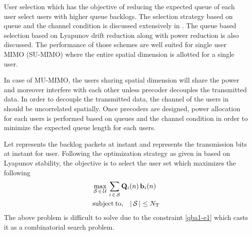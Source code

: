 
User selection which has the objective of reducing the expected queue of each user select users with higher queue backlogs. The selection strategy based on queue and the channel condition is discussed extensively in \cite{neely2012stability}. The queue based selection based on Lyapunov drift reduction along with power reduction is also discussed. The performance of those schemes are well suited for single user MIMO (SU-MIMO) where the entire spatial dimension is allotted for a single user. 

In case of MU-MIMO, the users sharing spatial dimension will share the power and moreover interfere with each other unless precoder decouples the transmitted data. In order to decouple the transmitted data, the channel of the users in  should be uncorrelated spatially. Once precoders are designed, power allocation for each users is performed based on queues and the channel condition in order to minimize the expected queue length for each users.

Let  represents the backlog packets at  instant and  represents the transmission bits at  instant for  user. Following the optimization strategy as given in \cite{neely2012stability} based on Lyapunov stability, the objective is to select the user set  which maximizes the following
\begin{eqnarray}
&\displaystyle \max_{\mathcal{S} \, \in \, \mathcal{U}} \, \sum_{i \, \in \, \mathcal{S}}\mathbf{Q}_i(n) \, \mathbf{b}_i(n) \\
&\displaystyle \mathrm{subject \: to,} \quad | \, \mathcal{S} \, | \leq N_{\mathrm{T}}
\label{qba1-e1}
\end{eqnarray}  
The above problem is difficult to solve due to the constraint \eqref{qba1-e1} which casts it as a combinatorial search problem.
